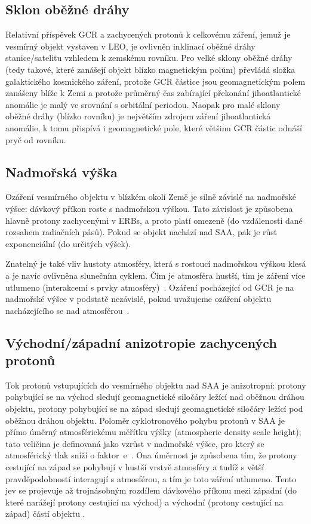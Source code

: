 \subsection{Sklon oběžné dráhy}
Relativní příspěvek GCR a zachycených protonů k celkovému záření, jemuž je vesmírný objekt vystaven v LEO, je ovlivněn inklinací oběžné dráhy stanice/satelitu vzhledem k zemskému rovníku. Pro velké sklony oběžné dráhy (tedy takové, které zanášejí objekt blízko magnetickým polům) převládá složka galaktického kosmického záření, protože GCR částice jsou geomagnetickým polem zanášeny blíže k Zemi a protože průměrný čas zabírající překonání jihoatlantické anomálie je malý ve srovnání s orbitální periodou. Naopak pro malé sklony oběžné dráhy (blízko rovníku) je největším zdrojem záření jihoatlantická anomálie, k tomu přispívá i geomagnetické pole, které většinu GCR částic odnáší pryč od rovníku.
\subsection{Nadmořská výška}\label{sec:kosmickeZareni_altitude}
Ozáření vesmírného objektu v blízkém okolí Země je silně závislé na nadmořské výšce: dávkový příkon roste s nadmořskou výškou. Tato závislost je způsobena hlavně protony zachycenými v ERBs, a proto platí omezeně (do vzdálenosti dané rozsahem radiačních pásů). Pokud se objekt nachází nad SAA, pak je růst exponenciální (do určitých výšek). 

Znatelný je také vliv hustoty atmosféry, která s rostoucí nadmořskou výškou klesá a je navíc ovlivněna slunečním cyklem. Čím je atmosféra hustší, tím je záření více utlumeno (interakcemi s prvky atmosféry)~\cite{benton}. Ozáření pocházející od GCR je na nadmořské výšce v podstatě nezávislé, pokud uvažujeme ozáření objektu nacházejícího se nad atmosférou~\cite{dosis}. 
\subsection{Východní/západní anizotropie zachycených protonů}\label{sec:kosmickeZareni_anizotropie}
Tok protonů vstupujících do vesmírného objektu nad SAA je anizotropní: protony pohybující se na východ sledují geomagnetické siločáry ležící nad oběžnou dráhou objektu, protony pohybující se na západ sledují geomagnetické siločáry ležící pod oběžnou dráhou objektu. Poloměr cyklotronového pohybu protonů v SAA %
je přímo úměrný atmosférickému měřítku výšky (atmospheric density scale height); tato veličina je definovaná jako vzrůst v nadmořské výšce, pro který se atmosférický tlak sníží o faktor~e~\cite{scaleHeight_wiki}. Ona úměrnost je způsobena tím, že protony cestující na západ se pohybují v hustší vrstvě atmosféry a tudíž s větší pravděpodobností interagují s atmosférou, a tím je toto záření utlumeno. Tento jev se projevuje až trojnásobným rozdílem dávkového příkonu mezi západní (do které narážejí protony cestující na východ) a východní (protony cestující na západ) částí objektu \cite{benton}. 
